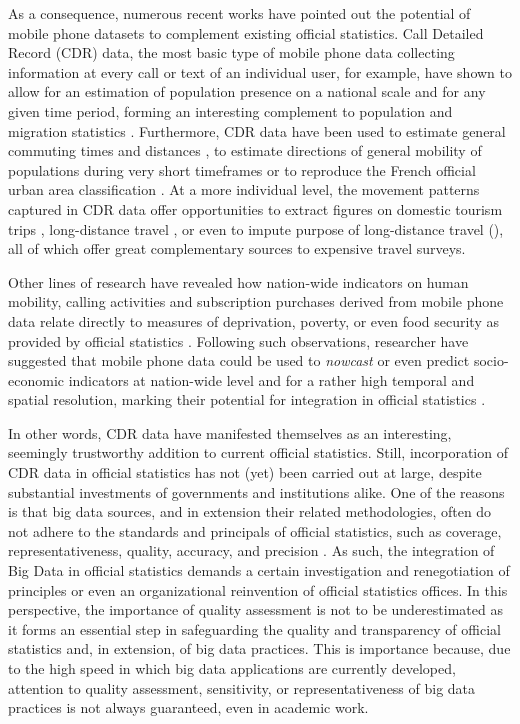 \documentclass[a4paper]{article}
\begin{document}
As a consequence, numerous recent works have pointed out the potential of mobile phone datasets to complement existing official statistics. Call Detailed Record (CDR) data, the most basic type of mobile phone data collecting information at every call or text of an individual user, for example, have shown to allow for an estimation of population presence on a national scale and for any given time period, forming an interesting complement to population and migration statistics \cite{Deville2014}. Furthermore, CDR data have been used to estimate general commuting times and distances \cite{Kung2014}, to estimate directions of general mobility of populations during very short timeframes \cite{Balzotti2018} or to reproduce the French official urban area classification \cite{Vanhoof_miningurbanareas}. At a more individual level, the movement patterns captured in CDR data offer opportunities to extract figures on domestic tourism trips \cite{Vanhoof_domestictourism}, long-distance travel \cite{Janzen2018_closer}, or even to impute purpose of long-distance travel (\cite{Janzen_Purpose}), all of which offer great complementary sources to expensive travel surveys.

Other lines of research have revealed how nation-wide indicators on human mobility, calling activities and subscription purchases derived from mobile phone data relate directly to measures of deprivation, poverty, or even food security as provided by official statistics \cite{Pappalardo2016,Eagle2010,Frias-martinez2013,Decuyper2014,Vanhoof_entropy}. Following such observations, researcher have suggested that mobile phone data could be used to \textit{nowcast} or even predict socio-economic indicators at nation-wide level and for a rather high temporal and spatial resolution, marking their potential for integration in official statistics \cite{Pappalardo2015,Giannotti2012,Pappalardo2016}. 

In other words, CDR data have manifested themselves as an interesting, seemingly trustworthy addition to current official statistics. Still, incorporation of CDR data in official statistics has not (yet) been carried out at large, despite substantial investments of governments and institutions alike. One of the reasons is that big data sources, and in extension their related methodologies, often do not adhere to the standards and principals of official statistics, such as coverage, representativeness, quality, accuracy, and precision \cite{Daas2015,Vanhoof_JOS}. As such, the integration of Big Data in official statistics demands a certain investigation and renegotiation of principles or even an organizational reinvention of official statistics offices. In this perspective, the importance of quality assessment is not to be underestimated as it forms an essential step in safeguarding the quality and transparency of official statistics and, in extension, of big data practices. This is importance because, due to the high speed in which big data applications are currently developed, attention to quality assessment, sensitivity, or representativeness of big data practices is not always guaranteed, even in academic work.
\end{document}
